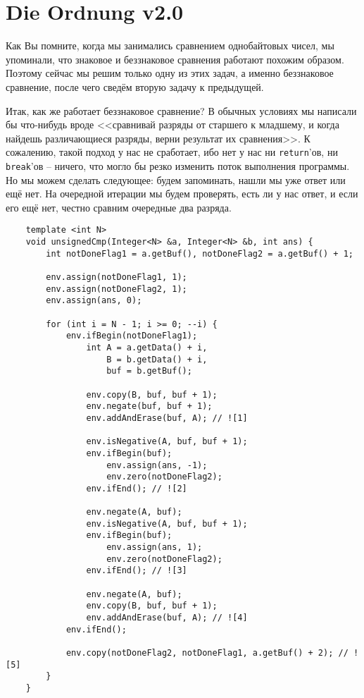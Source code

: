 \documentclass{book}
\begin{document}
\section{Die Ordnung v2.0}

Как Вы помните, когда мы занимались сравнением однобайтовых чисел, мы упоминали, что знаковое и беззнаковое сравнения работают похожим
образом. Поэтому сейчас мы решим только одну из этих задач, а именно беззнаковое сравнение, после чего сведём вторую задачу к
предыдущей.

Итак, как же работает беззнаковое сравнение? В обычных условиях мы написали бы что-нибудь вроде <<сравнивай разряды от старшего к
младшему, и когда найдешь различающиеся разряды, верни результат их сравнения>>. К сожалению, такой подход у нас не сработает, ибо
нет у нас ни \texttt{return}'ов, ни \texttt{break}'ов -- ничего, что могло бы резко изменить поток выполнения программы. Но мы можем
сделать следующее: будем запоминать, нашли мы уже ответ или ещё нет. На очередной итерации мы будем проверять, есть ли у нас ответ,
и если его ещё нет, честно сравним очередные два разряда. 


\begin{verbatim}
    template <int N>
    void unsignedCmp(Integer<N> &a, Integer<N> &b, int ans) {
        int notDoneFlag1 = a.getBuf(), notDoneFlag2 = a.getBuf() + 1;
        
        env.assign(notDoneFlag1, 1);
        env.assign(notDoneFlag2, 1);
        env.assign(ans, 0);

        for (int i = N - 1; i >= 0; --i) {
            env.ifBegin(notDoneFlag1);
                int A = a.getData() + i, 
                    B = b.getData() + i, 
                    buf = b.getBuf();

                env.copy(B, buf, buf + 1);
                env.negate(buf, buf + 1);
                env.addAndErase(buf, A); // ![1]

                env.isNegative(A, buf, buf + 1);
                env.ifBegin(buf);
                    env.assign(ans, -1);
                    env.zero(notDoneFlag2);
                env.ifEnd(); // ![2]

                env.negate(A, buf);
                env.isNegative(A, buf, buf + 1);
                env.ifBegin(buf);
                    env.assign(ans, 1);
                    env.zero(notDoneFlag2);
                env.ifEnd(); // ![3]

                env.negate(A, buf);
                env.copy(B, buf, buf + 1);
                env.addAndErase(buf, A); // ![4]
            env.ifEnd();

            env.copy(notDoneFlag2, notDoneFlag1, a.getBuf() + 2); // ![5]
        }
    }
\end{verbatim}
\end{document}
